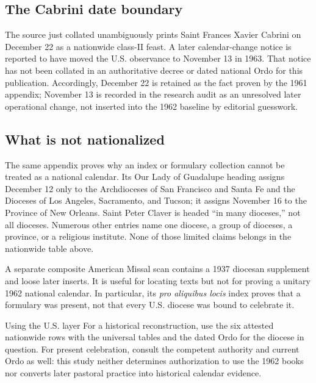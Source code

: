 \subsection{The Cabrini date boundary}

The source just collated unambiguously prints Saint Frances Xavier Cabrini on December 22 as a nationwide class-II feast. A later calendar-change notice is reported to have moved the U.S. observance to November 13 in 1963. That notice has not been collated in an authoritative decree or dated national Ordo for this publication. Accordingly, December 22 is retained as the fact proven by the 1961 appendix; November 13 is recorded in the research audit as an unresolved later operational change, not inserted into the 1962 baseline by editorial guesswork.

\subsection{What is not nationalized}

The same appendix proves why an index or formulary collection cannot be treated as a national calendar. Its Our Lady of Guadalupe heading assigns December 12 only to the Archdioceses of San Francisco and Santa Fe and the Dioceses of Los Angeles, Sacramento, and Tucson; it assigns November 16 to the Province of New Orleans. Saint Peter Claver is headed ``in many dioceses,'' not all dioceses. Numerous other entries name one diocese, a group of dioceses, a province, or a religious institute. None of those limited claims belongs in the nationwide table above.

A separate composite American Missal scan contains a 1937 diocesan supplement and loose later inserts. It is useful for locating texts but not for proving a unitary 1962 national calendar. In particular, its \emph{pro aliquibus locis} index proves that a formulary was present, not that every U.S. diocese was bound to celebrate it.

\begin{studybox}{Using the U.S. layer}
For a historical reconstruction, use the six attested nationwide rows with the universal tables and the dated Ordo for the diocese in question. For present celebration, consult the competent authority and current Ordo as well: this study neither determines authorization to use the 1962 books nor converts later pastoral practice into historical calendar evidence.
\end{studybox}
